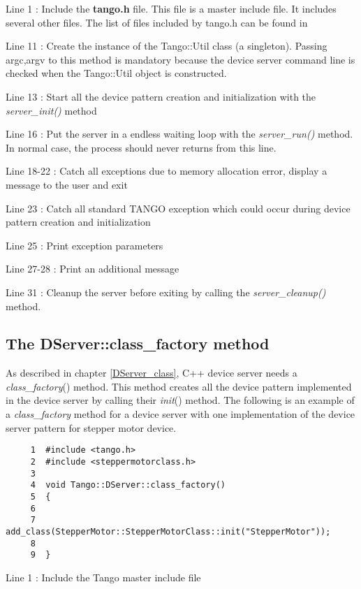 Line 1 : Include the \textbf{tango.h} file. This file is a master
include file. It includes several other files. The list of files included
by tango.h can be found in \cite{TANGO_ref_man}

Line 11 : Create the instance of the Tango::Util class
(a singleton). Passing argc,argv to this method is mandatory because
the device server command line is checked when the Tango::Util object
is constructed.

Line 13 : Start all the device pattern creation and initialization
with the \emph{server\_init()} method

Line 16 : Put the server in a endless waiting loop with the \emph{server\_run()}
method. In normal case, the process should never returns from this
line.

Line 18-22 : Catch all exceptions due to memory allocation error,
display a message to the user and exit

Line 23 : Catch all standard TANGO exception which could occur during
device pattern creation and initialization

Line 25 : Print exception parameters

Line 27-28 : Print an additional message

Line 31 : Cleanup the server before exiting by calling the \emph{server\_cleanup()}
method.


\subsection{The DServer::class\_factory method}

As described in chapter \ref{DServer_class}, C++ device server needs
a \emph{class\_factory}() method. This method creates all the device
pattern implemented in the device server by calling their \emph{init}()
method. The following is an example of a \emph{class\_factory}
method for a device server with one implementation of the device server
pattern for stepper motor device.


\begin{verbatim}
     1  #include <tango.h>
     2  #include <steppermotorclass.h>
     3  
     4  void Tango::DServer::class_factory()
     5  {
     6  
     7     add_class(StepperMotor::StepperMotorClass::init("StepperMotor"));
     8  
     9  }
\end{verbatim}


Line 1 : Include the Tango master include file

